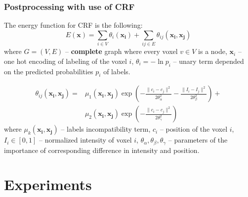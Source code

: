 \documentclass{beamer}
\begin{document}
\begin{frame}
    \frametitle{Postprocessing with use of CRF}

    The energy function for CRF is the following:
    \begin{equation*}
        E(\mathbf{x}) =\sum\limits_{i \in V} \theta_i (\mathbf{x_i}) +
        \sum\limits_{ij \in E} \theta_{ij} (\mathbf{x_i}, \mathbf{x_j})
    \end{equation*}
    where \( G = (V, E) \) -- \textbf{complete} graph where every voxel \( v \in V \) is a node,
    \(\mathbf{x}_i\) -- one hot encoding of labeling of the voxel \( i \),
    \( \theta_i = -\ln{p_i} \) -- unary term depended on the predicted probabilities \( p_i \) of labels.

    \begin{equation}  \label{eq:crf_pairwise_term}
        \begin{aligned}
            \theta_{ij} (\mathbf{x_i}, \mathbf{x_j}) = & \mu_1(\mathbf{x_i}, \mathbf{x_j})
            \exp \left( -\frac{\| c_i - c_j \|^2}{2 \theta_{\alpha}^2}
            -\frac{\| I_i - I_j \|^2}{2 \theta_{\beta}^2} \right) +                                                                                            \\
                                                       & \mu_2 (\mathbf{x_i}, \mathbf{x_j}) \exp \left( -\frac{\| c_i - c_j \|^2}{2 \theta_{\gamma}^2} \right)
        \end{aligned}
    \end{equation}
    where \( \mu_k(\mathbf{x_i}, \mathbf{x_j})\)
    -- labels incompatibility term, \( c_i \) -- position of the voxel \( i \),
    \( I_i \in [0, 1] \) -- normalized intensity of voxel \( i \),
    \( \theta_{\alpha}, \theta_{\beta}, \theta_{\gamma}\) -- parameters of the
    importance of corresponding difference in intensity and position.

\end{frame}

\section{Experiments}
\end{document}
